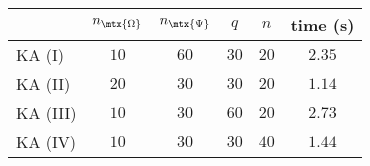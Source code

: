 \centering
\renewcommand{\arraystretch}{1.2}
\begin{tabular}{@{}lccccc@{}}
\toprule
 & $n_{\mtx{\Omega}}$ & $n_{\mtx{\Psi}}$ & $q$ & $n$ & time (s)\\
\midrule
KA (I) & $10$ & $60$ & $30$ & $20$ & $2.35$ \\
KA (II) & $20$ & $30$ & $30$ & $20$ & $1.14$ \\
KA (III) & $10$ & $30$ & $60$ & $20$ & $2.73$ \\
KA (IV) & $10$ & $30$ & $30$ & $40$ & $1.44$ \\
\bottomrule
\end{tabular}
